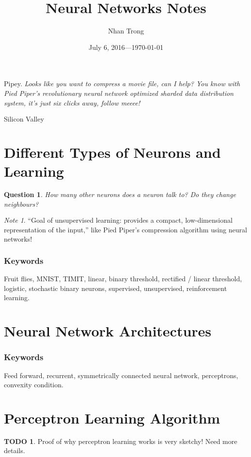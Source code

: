 \documentclass[12pt]{article}
\title{Neural Networks Notes}
\author{Nhan Trong}
\date{July 6, 2016---\today}                                           %
\theoremstyle{plain}
\newtheorem{question}[theorem]{Question}
\theoremstyle{definition}
\newtheorem{todo}{TODO}
\theoremstyle{remark}
\newtheorem{note}[theorem]{Note}
\begin{document}
\sloppy
\maketitle

\epigraph{Pipey. \textit{Looks like you want to compress a movie file, can I help? You know with Pied Piper's revolutionary neural network optimized sharded data distribution system, it's just six clicks away, follow meeee!}}{Silicon Valley}

\part{Different Types of Neurons and Learning}

\begin{question}
How many other neurons does a neuron talk to? Do they change neighbours?
\end{question}

\begin{note}
``Goal of unsupervised learning: provides a compact, low-dimensional representation of the input,'' like Pied Piper's compression algorithm using neural networks!
\end{note}

\section{Keywords}

Fruit flies, MNIST, TIMIT, linear, binary threshold, rectified / linear threshold, logistic, stochastic binary neurons, supervised, unsupervised, reinforcement learning.

\part{Neural Network Architectures}

\section{Keywords}

Feed forward, recurrent, symmetrically connected neural network, perceptrons, convexity condition.

\part{Perceptron Learning Algorithm}

\begin{todo}
Proof of why perceptron learning works is very sketchy! Need more details.
\end{todo}
\end{document}
